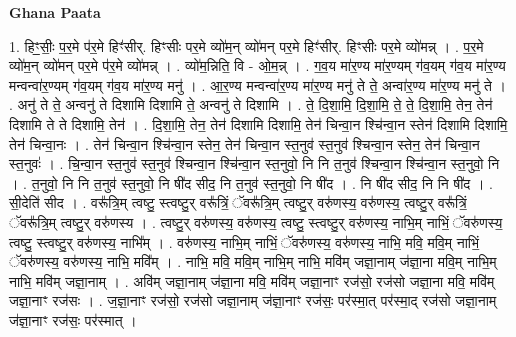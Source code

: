 \documentclass[17pt]{extarticle}
\begin{document}
\textbf{Ghana Paata } \newline

1. हिꣳ॒॒सीः॒ प॒र॒मे प॑र॒मे हिꣳ॑सीर्. हिꣳसीः पर॒मे व्यो॑म॒न् व्यो॑मन् पर॒मे हिꣳ॑सीर्. हिꣳसीः पर॒मे व्यो॑मन्न् । . प॒र॒मे व्यो॑म॒न् व्यो॑मन् पर॒मे प॑र॒मे व्यो॑मन्न् । . व्यो॑म॒न्निति॒ वि - ओ॒म॒न्न् । . ग॒व॒य मा॑र॒ण्य मा॑र॒ण्यम् ग॑व॒यम् ग॑व॒य मा॑र॒ण्य मन्वन्वा॑र॒ण्यम् ग॑व॒यम् ग॑व॒य मा॑र॒ण्य मनु॑ । . आ॒र॒ण्य मन्वन्वा॑र॒ण्य मा॑र॒ण्य मनु॑ ते ते॒ अन्वा॑र॒ण्य मा॑र॒ण्य मनु॑ ते । . अनु॑ ते ते॒ अन्वनु॑ ते दिशामि दिशामि ते॒ अन्वनु॑ ते दिशामि । . ते॒ दि॒शा॒मि॒ दि॒शा॒मि॒ ते॒ ते॒ दि॒शा॒मि॒ तेन॒ तेन॑ दिशामि ते ते दिशामि॒ तेन॑ । . दि॒शा॒मि॒ तेन॒ तेन॑ दिशामि दिशामि॒ तेन॑ चिन्वा॒न श्चि॑न्वा॒न स्तेन॑ दिशामि दिशामि॒ तेन॑ चिन्वा॒नः । . तेन॑ चिन्वा॒न श्चि॑न्वा॒न स्तेन॒ तेन॑ चिन्वा॒न स्त॒नुव॑ स्त॒नुव॑ श्चिन्वा॒न स्तेन॒ तेन॑ चिन्वा॒न स्त॒नुवः॑ । . चि॒न्वा॒न स्त॒नुव॑ स्त॒नुव॑ श्चिन्वा॒न श्चि॑न्वा॒न स्त॒नुवो॒ नि नि त॒नुव॑ श्चिन्वा॒न श्चि॑न्वा॒न स्त॒नुवो॒ नि । . त॒नुवो॒ नि नि त॒नुव॑ स्त॒नुवो॒ नि षी॑द सीद॒ नि त॒नुव॑ स्त॒नुवो॒ नि षी॑द । . नि षी॑द सीद॒ नि नि षी॑द । . सी॒देति॑ सीद । . वरू᳚त्रि॒म् त्वष्टु॒ स्त्वष्टु॒र् वरू᳚त्रिं॒ ॅवरू᳚त्रि॒म् त्वष्टु॒र् वरु॑णस्य॒ वरु॑णस्य॒ त्वष्टु॒र् वरू᳚त्रिं॒ ॅवरू᳚त्रि॒म् त्वष्टु॒र् वरु॑णस्य । . त्वष्टु॒र् वरु॑णस्य॒ वरु॑णस्य॒ त्वष्टु॒ स्त्वष्टु॒र् वरु॑णस्य॒ नाभि॒म् नाभिं॒ ॅवरु॑णस्य॒ त्वष्टु॒ स्त्वष्टु॒र् वरु॑णस्य॒ नाभि᳚म् । . वरु॑णस्य॒ नाभि॒म् नाभिं॒ ॅवरु॑णस्य॒ वरु॑णस्य॒ नाभि॒ मवि॒ मवि॒म् नाभिं॒ ॅवरु॑णस्य॒ वरु॑णस्य॒ नाभि॒ मवि᳚म् । . नाभि॒ मवि॒ मवि॒म् नाभि॒म् नाभि॒ मवि॑म् जज्ञा॒नाम् ज॑ज्ञा॒ना मवि॒म् नाभि॒म् नाभि॒ मवि॑म् जज्ञा॒नाम् । . अवि॑म् जज्ञा॒नाम् ज॑ज्ञा॒ना मवि॒ मवि॑म् जज्ञा॒नाꣳ रज॑सो॒ रज॑सो जज्ञा॒ना मवि॒ मवि॑म् जज्ञा॒नाꣳ रज॑सः । . ज॒ज्ञा॒नाꣳ रज॑सो॒ रज॑सो जज्ञा॒नाम् ज॑ज्ञा॒नाꣳ रज॑सः॒ पर॑स्मा॒त् पर॑स्मा॒द् रज॑सो जज्ञा॒नाम् ज॑ज्ञा॒नाꣳ रज॑सः॒ पर॑स्मात् । \newline
\end{document}
